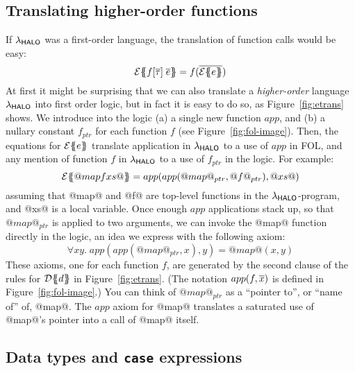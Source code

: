 \subsection{Translating higher-order functions} \label{s:hof}

If $\lambda_{\sf HALO}$ was
a first-order language, the translation of function calls would be easy:
$$
\etrans{\Sigma}{\Gamma}{f[\ol{\tau}]\;\ol{e}} = \formula{f(\ol{\etrans{}{}{e}})} \\
$$
At first it might be surprising that we can also translate a \emph{higher-order} language
$\lambda_{\sf HALO}$ into first order logic, but in fact it is easy to do so, as
Figure~\ref{fig:etrans} shows.  We introduce into the logic
(a) a single new function $app$, and (b) a nullary constant $f_{ptr}$ for each function $f$
(see Figure~\ref{fig:fol-image}).
Then, the equations for ${\cal E}\{\!\!\{e\}\!\!\}$ translate application in $\lambda_{\sf HALO}$ to
a use of $app$ in FOL, and any mention of function $f$ in $\lambda_{\sf HALO}$ to a use
of $f_{ptr}$ in the logic.  For example:
$$
{\cal E}\{\!\!\{@map f xs@\}\!\!\} = app( app( @map@_{ptr}, @f@_{ptr}), @xs@)
$$
assuming that @map@ and @f@ are top-level functions in the $\lambda_{\sf HALO}$-program, and
@xs@ is a local variable.  Once enough $app$ applications stack up, so that
$@map@_{ptr}$ is applied to two arguments, we can invoke the @map@ function directly 
in the logic, an idea we express with the following axiom:
$$
\forall x y.\;app(app(@map@_{ptr}, x), y) = @map@(x,y)
$$
These axioms, one for each function $f$, are generated by the second
clause of the rules for ${\cal D}\{\!\!\{d\}\!\!\}$ in Figure~\ref{fig:etrans}.
(The notation $app(f,\overline{x})$ is defined in Figure~\ref{fig:fol-image}.)
You can think of $@map@_{ptr}$ as a ``pointer to'', or ``name of'' of, @map@.
The $app$ axiom for @map@ translates a saturated use of @map@'s pointer into
a call of @map@ itself.



\subsection{Data types and {\tt case} expressions} \label{s:case-fol}

